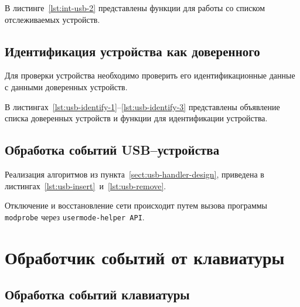 В листинге~\ref{lst:int-usb-2} представлены функции для работы со списком отслеживаемых устройств.

\clearpage


\subsection{Идентификация устройства как доверенного}

Для проверки устройства необходимо проверить его идентификационные данные с данными доверенных устройств. 

В листингах~\ref{lst:usb-identify-1}--\ref{lst:usb-identify-3} представлены объявление списка доверенных устройств и функции для идентификации устройства.




\subsection{Обработка событий USB--устройства}
\label{sect:usb-handler-impl}

Реализация алгоритмов из пункта~\ref{sect:usb-handler-design}, приведена в листингах~\ref{lst:usb-insert}~и~\ref{lst:usb-remove}.

Отключение и восстановление сети происходит путем вызова программы \texttt{modprobe} через \texttt{usermode-helper API}.


\clearpage

    
\section{Обработчик событий от клавиатуры}

\subsection{Обработка событий клавиатуры}
\label{sect:kbd-handler-impl}


